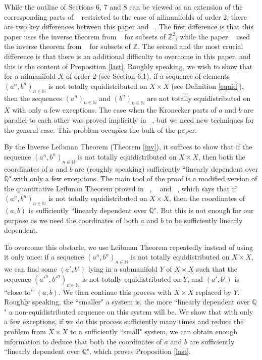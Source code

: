 \documentclass[12pt,amstex]{amsart}
\theoremstyle{definition}
\def \N {\mathbb{N}}
\begin{document}
While the outline of Sections 6, 7 and 8 can be viewed as an extension of the corresponding parts of ~\cite{FHel} restricted to the case of nilmanifolds of order 2, there are two key differences between this paper and ~\cite{FHel}. The first difference is that this paper uses the inverse theorem from ~\cite{Sz} for subsets of $\mathbb{Z}^{2}$, while the paper ~\cite{FHel} used the inverse theorem from ~\cite{6} for subsets of $\mathbb{Z}$. The second and the most crucial difference is that there is an additional difficulty to overcome in this paper, and this is the content of Proposition \ref{last}.
  Roughly speaking, we wish to show that for a nilmanifold $X$ of order 2 (see Section 6.1), if a sequence of elements $(a^{n},b^{n})_{n\in\N}$ is not totally equidistributed on $X\times X$ (see Definition \ref{equid}), then the sequences
  $(a^{n})_{n\in\N}$ and $(b^{n})_{n\in\N}$ are not totally equidistributed on $X$ with only a few exceptions. The case when the Kronecker parts of $a$ and $b$ are parallel to each other was proved implicitly in ~\cite{FH}, but we need new techniques for the general case. This problem occupies the bulk of the paper.

  By the Inverse Leibman Theorem (Theorem \ref{inv}), it suffices to show that if the sequence $(a^{n},b^{n})_{n\in\N}$ is not totally equidistributed on $X\times X$, then
  both the coordinates of $a$ and $b$ are (roughly speaking) sufficiently ``linearly dependent over $\mathbb{Q}$"  with only a few exceptions.
  The main tool of the proof is a modified version of the quantitative Leibman Theorem proved in ~\cite{er}, ~\cite{er2} and ~\cite{GT}, which says that if $(a^{n},b^{n})_{n\in\N}$ is not totally equidistributed on $X\times X$, then the coordinates of $(a,b)$ is sufficiently ``linearly dependent over $\mathbb{Q}$". But this is not enough for our purpose as we need the coordinates of both $a$ and $b$ to be sufficiently linearly dependent.

  To overcome this obstacle, we use Leibman Theorem repeatedly instead of using it only once: if a sequence $(a^{n},b^{n})_{n\in\N}$ is not totally equidistributed on $X\times X$,
  we can find some $(a',b')$ lying in a submanifold $Y$ of $X\times X$ such that the sequence $(a'^{n},b'^{n})_{n\in\N}$ is not totally equidistributed on $Y$, and $(a',b')$ is ``close to'' $(a,b)$. We then continue this process with $X\times X$ replaced by $Y$. Roughly speaking, the ``smaller" a system is, the more ``linearly dependent over $\mathbb{Q}$" a non-equidistributed sequence on this system will be. We show that with only a few exceptions, if we do this process sufficiently many times and reduce the problem from $X\times X$ to a sufficiently ``small" system, we can obtain enough information to deduce that both the coordinates of $a$ and $b$ are sufficiently ``linearly dependent over $\mathbb{Q}$", which proves Proposition \ref{last}.
\end{document}
